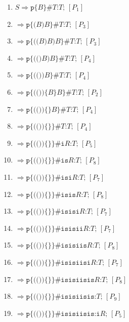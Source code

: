 {\scriptsize
\begin{enumerate}[leftmargin=1.7em, itemsep=0.5pt, topsep=2pt]
    \item $S \Rightarrow \texttt{p\{}B\texttt{\}\#}T\texttt{:}T\texttt{;}$ \hfill $[P_1]$
    \item $\Rightarrow \texttt{p\{(}B\texttt{)}B\texttt{\}\#}T\texttt{:}T\texttt{;}$ \hfill $[P_3]$
    \item $\Rightarrow \texttt{p\{((}B\texttt{)}B\texttt{)}B\texttt{\}\#}T\texttt{:}T\texttt{;}$ \hfill $[P_3]$
    \item $\Rightarrow \texttt{p\{(()}B\texttt{)}B\texttt{\}\#}T\texttt{:}T\texttt{;}$ \hfill $[P_4]$
    \item $\Rightarrow \texttt{p\{(())}B\texttt{\}\#}T\texttt{:}T\texttt{;}$ \hfill $[P_4]$
    \item $\Rightarrow \texttt{p\{(())\{}B\texttt{\}}B\texttt{\}\#}T\texttt{:}T\texttt{;}$ \hfill $[P_2]$
    \item $\Rightarrow \texttt{p\{(())\{\}}B\texttt{\}\#}T\texttt{:}T\texttt{;}$ \hfill $[P_4]$
    \item $\Rightarrow \texttt{p\{(())\{\}\}\#}T\texttt{:}T\texttt{;}$ \hfill $[P_4]$
    \item $\Rightarrow \texttt{p\{(())\{\}\}\#i}R\texttt{:}T\texttt{;}$ \hfill $[P_5]$
    \item $\Rightarrow \texttt{p\{(())\{\}\}\#is}R\texttt{:}T\texttt{;}$ \hfill $[P_8]$
    \item $\Rightarrow \texttt{p\{(())\{\}\}\#isi}R\texttt{:}T\texttt{;}$ \hfill $[P_7]$
    \item $\Rightarrow \texttt{p\{(())\{\}\}\#isis}R\texttt{:}T\texttt{;}$ \hfill $[P_8]$
    \item $\Rightarrow \texttt{p\{(())\{\}\}\#isisi}R\texttt{:}T\texttt{;}$ \hfill $[P_7]$
    \item $\Rightarrow \texttt{p\{(())\{\}\}\#isisii}R\texttt{:}T\texttt{;}$ \hfill $[P_7]$
    \item $\Rightarrow \texttt{p\{(())\{\}\}\#isisiis}R\texttt{:}T\texttt{;}$ \hfill $[P_8]$
    \item $\Rightarrow \texttt{p\{(())\{\}\}\#isisiisi}R\texttt{:}T\texttt{;}$ \hfill $[P_7]$
    \item $\Rightarrow \texttt{p\{(())\{\}\}\#isisiisis}R\texttt{:}T\texttt{;}$ \hfill $[P_8]$
    \item $\Rightarrow \texttt{p\{(())\{\}\}\#isisiisis:}T\texttt{;}$ \hfill $[P_9]$
    \item $\Rightarrow \texttt{p\{(())\{\}\}\#isisiisis:i}R\texttt{;}$ \hfill $[P_5]$

\end{enumerate}}
